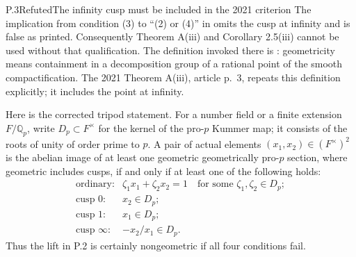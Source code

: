 \begin{result}{P.3}{Refuted}{The infinity cusp must be included in the 2021 criterion}
The implication from condition (3) to ``(2) or (4)'' in
\citet[Proposition 1.4(ii), article p.~6]{LitHoshiTsujimura2021}
omits the cusp at infinity and is false as printed.
Consequently Theorem A(iii) and Corollary 2.5(iii) cannot be used without
that qualification. The definition invoked there is
\citet[Definition 1.1(iii), author p.~7]{LitHoshi2010}: geometricity means
containment in a decomposition group of a rational point of the smooth
compactification. The 2021 Theorem A(iii), article p.~3, repeats this
definition explicitly; it includes the point at infinity.

Here is the corrected tripod statement. For a number field or a finite
extension \(F/\mathbb Q_p\), write \(D_p\subset F^\times\) for
the kernel of the pro-\(p\) Kummer map; it consists of the roots of unity
of order prime to \(p\). A pair of actual elements
\((x_1,x_2)\in(F^\times)^2\) is the abelian image of at least one
geometric geometrically pro-\(p\) section, where geometric includes
cusps, if and only if at least one of the following holds:
\[
\begin{array}{ll}
\text{ordinary:}&\zeta_1x_1+\zeta_2x_2=1
                  \quad\text{for some }\zeta_1,\zeta_2\in D_p;\\
\text{cusp }0:&x_2\in D_p;\\
\text{cusp }1:&x_1\in D_p;\\
\text{cusp }\infty:&-x_2/x_1\in D_p.
\end{array}
\]
Thus the lift in P.2 is certainly nongeometric if all four conditions fail.
\end{result}
